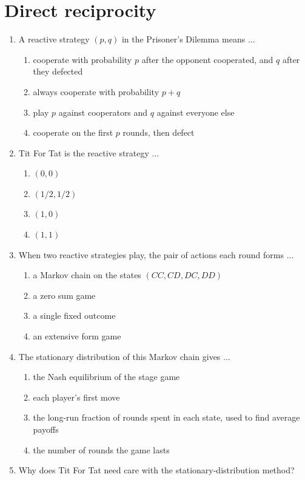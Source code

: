 \documentclass[11pt]{article}
\begin{document}
\section*{Direct reciprocity}
\begin{enumerate}[itemsep=6pt]
  \item A reactive strategy \((p, q)\) in the Prisoner's Dilemma means ...
  \begin{enumerate}
    \item cooperate with probability \(p\) after the opponent cooperated, and \(q\) after they defected
    \item always cooperate with probability \(p + q\)
    \item play \(p\) against cooperators and \(q\) against everyone else
    \item cooperate on the first \(p\) rounds, then defect
  \end{enumerate}
  \item Tit For Tat is the reactive strategy ...
  \begin{enumerate}
    \item \((0, 0)\)
    \item \((1/2, 1/2)\)
    \item \((1, 0)\)
    \item \((1, 1)\)
  \end{enumerate}
  \item When two reactive strategies play, the pair of actions each round forms ...
  \begin{enumerate}
    \item a Markov chain on the states \((CC, CD, DC, DD)\)
    \item a zero sum game
    \item a single fixed outcome
    \item an extensive form game
  \end{enumerate}
  \item The stationary distribution of this Markov chain gives ...
  \begin{enumerate}
    \item the Nash equilibrium of the stage game
    \item each player's first move
    \item the long-run fraction of rounds spent in each state, used to find average payoffs
    \item the number of rounds the game lasts
  \end{enumerate}
  \item Why does Tit For Tat need care with the stationary-distribution method?

\end{enumerate}
\end{document}
